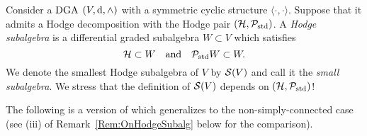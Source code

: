 \documentclass[\MainFolder/Text.tex]{subfiles}
\begin{document}
\begin{Definition}\label{Def:SmallSubalg}
Consider a $\mathrm{DGA}$ $(V,\mathrm{d},\wedge)$ with a symmetric cyclic structure $\langle\cdot,\cdot\rangle$. Suppose that it admits a Hodge decomposition with the Hodge pair $(\mathcal{H},\mathcal{P}_{\mathrm{std}})$. A \emph{Hodge subalgebra} is a differential graded subalgebra $W\subset V$ which satisfies
$$ \mathcal{H}\subset W \quad\text{and}\quad \mathcal{P}_{\mathrm{std}} W \subset W. $$
We denote the smallest Hodge subalgebra of $V$ by $\mathcal{S}(V)$ and call it the \emph{small subalgebra}. We stress that the definition of $\mathcal{S}(V)$ depends on $(\mathcal{H},\mathcal{P}_{\mathrm{std}})$!
\end{Definition}

The following is a version of \cite[Proposition~3.3]{Van2019} which generalizes to the non-simply-connected case (see (iii) of Remark~\ref{Rem:OnHodgeSubalg} below for the comparison).
\end{document}

